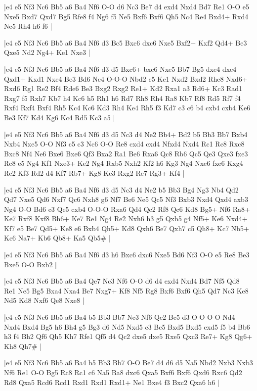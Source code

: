 \whitename{}
\blackname{}
\makegametitle
|e4 e5 Nf3 Nc6 Bb5 a6 Ba4 Nf6 O-O d6 Nc3 Be7 d4 exd4 Nxd4 Bd7 Re1 O-O e5 Nxe5 Bxd7 Qxd7 Bg5 Rfe8 f4 Ng6 f5 Ne5 Bxf6 Bxf6 Qh5 Nc4 Re4 Bxd4+ Rxd4 Ne5 Rh4 h6 f6  |

\whitename{}
\blackname{}
\makegametitle
|e4 e5 Nf3 Nc6 Bb5 a6 Ba4 Nf6 d3 Bc5 Bxc6 dxc6 Nxe5 Bxf2+ Kxf2 Qd4+ Be3 Qxe5 Nd2 Ng4+ Ke1 Nxe3  |

\whitename{}
\blackname{}
\makegametitle
|e4 e5 Nf3 Nc6 Bb5 a6 Ba4 Nf6 d3 d5 Bxc6+ bxc6 Nxe5 Bb7 Bg5 dxe4 dxe4 Qxd1+ Kxd1 Nxe4 Be3 Bd6 Nc4 O-O-O Nbd2 c5 Kc1 Nxd2 Bxd2 Rhe8 Nxd6+ Rxd6 Rg1 Re2 Bf4 Rde6 Be3 Bxg2 Rxg2 Re1+ Kd2 Rxa1 a3 Rd6+ Kc3 Rad1 Rxg7 f5 Rxh7 Kb7 h4 Kc6 h5 Rh1 h6 Rd7 Rh8 Rh4 Ra8 Kb7 Rf8 Rd5 Rf7 f4 Rxf4 Rxf4 Bxf4 Rh5 Kc4 Kc6 Kd3 Rh4 Ke4 Rh5 f3 Kd7 c3 c6 b4 cxb4 cxb4 Ke6 Be3 Kf7 Kd4 Kg6 Kc4 Rd5 Kc3 a5  |

\whitename{}
\blackname{}
\makegametitle
|e4 e5 Nf3 Nc6 Bb5 a6 Ba4 Nf6 d3 d5 Nc3 d4 Ne2 Bb4+ Bd2 b5 Bb3 Bb7 Bxb4 Nxb4 Nxe5 O-O Nf3 c5 c3 Nc6 O-O Re8 cxd4 cxd4 Nfxd4 Nxd4 Rc1 Rc8 Rxc8 Bxc8 Nf4 Ne6 Bxe6 Bxe6 Qf3 Bxa2 Ra1 Be6 Rxa6 Qc8 Rb6 Qc5 Qe3 Qxe3 fxe3 Rc8 e5 Ng4 Kf1 Nxe3+ Ke2 Ng4 Rxb5 Nxh2 Kf2 h6 Kg3 Ng4 Nxe6 fxe6 Kxg4 Rc2 Kf3 Rd2 d4 Kf7 Rb7+ Kg8 Ke3 Rxg2 Re7 Rg3+ Kf4  |

\whitename{}
\blackname{}
\makegametitle
|e4 e5 Nf3 Nc6 Bb5 a6 Ba4 Nf6 d3 d5 Nc3 d4 Ne2 b5 Bb3 Bg4 Ng3 Nb4 Qd2 Qd7 Nxe5 Qd6 Nxf7 Qc6 Nxh8 g6 Nf7 Be6 Ne5 Qc5 Nf3 Bxb3 Nxd4 Qxd4 axb3 Ng4 O-O Bd6 c3 Qe5 cxb4 O-O-O Rxa6 Qd4 Qc2 Rf8 Qc6 Kd8 Bg5+ Nf6 Ra8+ Ke7 Rxf8 Kxf8 Bh6+ Ke7 Re1 Ng4 Re2 Nxh6 h3 g5 Qxb5 g4 Nf5+ Ke6 Nxd4+ Kf7 e5 Be7 Qd5+ Ke8 e6 Bxb4 Qh5+ Kd8 Qxh6 Be7 Qxh7 c5 Qh8+ Kc7 Nb5+ Kc6 Na7+ Kb6 Qb8+ Ka5 Qb5\#  |

\whitename{}
\blackname{}
\makegametitle
|e4 e5 Nf3 Nc6 Bb5 a6 Ba4 Nf6 d3 h6 Bxc6 dxc6 Nxe5 Bd6 Nf3 O-O e5 Re8 Be3 Bxe5 O-O Bxb2  |

\whitename{}
\blackname{}
\makegametitle
|e4 e5 Nf3 Nc6 Bb5 a6 Ba4 Qe7 Nc3 Nf6 O-O d6 d4 exd4 Nxd4 Bd7 Nf5 Qd8 Re1 Ne5 Bg5 Bxa4 Nxa4 Be7 Nxg7+ Kf8 Nf5 Rg8 Bxf6 Bxf6 Qh5 Qd7 Nc3 Ke8 Nd5 Kd8 Nxf6 Qe8 Nxe8  |

\whitename{}
\blackname{}
\makegametitle
|e4 e5 Nf3 Nc6 Bb5 a6 Ba4 b5 Bb3 Bb7 Nc3 Nf6 Qe2 Bc5 d3 O-O O-O Nd4 Nxd4 Bxd4 Bg5 h6 Bh4 g5 Bg3 d6 Nd5 Nxd5 c3 Bc5 Bxd5 Bxd5 exd5 f5 b4 Bb6 h3 f4 Bh2 Qf6 Qh5 Kh7 Rfe1 Qf5 d4 Qc2 dxe5 dxe5 Rxe5 Qxc3 Re7+ Kg8 Qg6+ Kh8 Qh7\#  |

\whitename{}
\blackname{}
\makegametitle
|e4 e5 Nf3 Nc6 Bb5 a6 Ba4 b5 Bb3 Bb7 O-O Be7 d4 d6 d5 Na5 Nbd2 Nxb3 Nxb3 Nf6 Re1 O-O Bg5 Rc8 Rc1 c6 Na5 Ba8 dxc6 Qxa5 Bxf6 Bxf6 Qxd6 Rxc6 Qd2 Rd8 Qxa5 Rcd6 Rcd1 Rxd1 Rxd1 Rxd1+ Ne1 Bxe4 f3 Bxc2 Qxa6 h6  |

